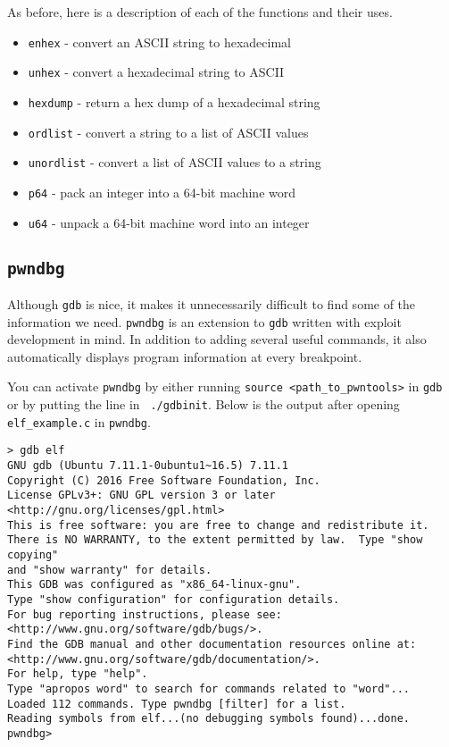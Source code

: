 \documentclass{article}
\begin{document}
As before, here is a description of each of the functions and their uses.
\begin{itemize}
    \item \texttt{enhex} - convert an ASCII string to hexadecimal
    \item \texttt{unhex} - convert a hexadecimal string to ASCII
    \item \texttt{hexdump} - return a hex dump of a hexadecimal string
    \item \texttt{ordlist} - convert a string to a list of ASCII values
    \item \texttt{unordlist} - convert a list of ASCII values to a string
    \item \texttt{p64} - pack an integer into a 64-bit machine word
    \item \texttt{u64} - unpack a 64-bit machine word into an integer
\end{itemize}

\subsection{\texttt{pwndbg}}
Although \texttt{gdb} is nice, it makes it unnecessarily difficult to find some
of the information we need. \texttt{pwndbg} is an extension to \texttt{gdb}
written with exploit development in mind. In addition to adding several useful
commands, it also automatically displays program information at every
breakpoint.

You can activate \texttt{pwndbg} by either running \texttt{source
<path\_to\_pwntools>} in \texttt{gdb} or by putting the line in
\texttt{~./gdbinit}. Below is the output after opening \texttt{elf\_example.c}
in \texttt{pwndbg}.

\begin{lstlisting}
> gdb elf
GNU gdb (Ubuntu 7.11.1-0ubuntu1~16.5) 7.11.1
Copyright (C) 2016 Free Software Foundation, Inc.
License GPLv3+: GNU GPL version 3 or later <http://gnu.org/licenses/gpl.html>
This is free software: you are free to change and redistribute it.
There is NO WARRANTY, to the extent permitted by law.  Type "show copying"
and "show warranty" for details.
This GDB was configured as "x86_64-linux-gnu".
Type "show configuration" for configuration details.
For bug reporting instructions, please see:
<http://www.gnu.org/software/gdb/bugs/>.
Find the GDB manual and other documentation resources online at:
<http://www.gnu.org/software/gdb/documentation/>.
For help, type "help".
Type "apropos word" to search for commands related to "word"...
Loaded 112 commands. Type pwndbg [filter] for a list.
Reading symbols from elf...(no debugging symbols found)...done.
pwndbg> 
\end{lstlisting}
\end{document}
